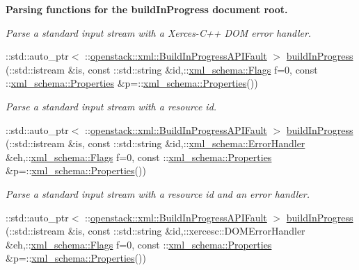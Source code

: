 \begin{Indent}{\bf Parsing functions for the buildInProgress document root.}
\begin{DoxyCompactItemize}
\begin{DoxyCompactList}\small\item\em Parse a standard input stream with a Xerces-\/C++ DOM error handler. \item\end{DoxyCompactList}\item 
::std::auto\_\-ptr$<$ ::\hyperlink{classopenstack_1_1xml_1_1BuildInProgressAPIFault}{openstack::xml::BuildInProgressAPIFault} $>$ \hyperlink{namespaceopenstack_1_1xml_a469ba28c425132f2e3344b29dd119644}{buildInProgress} (::std::istream \&is, const ::std::string \&id,::\hyperlink{namespacexml__schema_affb4c227cbd9aa7453dd1dc5a1401943}{xml\_\-schema::Flags} f=0, const ::\hyperlink{namespacexml__schema_ad27ce19a7ee1d3b1064092648898f64c}{xml\_\-schema::Properties} \&p=::\hyperlink{namespacexml__schema_ad27ce19a7ee1d3b1064092648898f64c}{xml\_\-schema::Properties}())
\begin{DoxyCompactList}\small\item\em Parse a standard input stream with a resource id. \item\end{DoxyCompactList}\item 
::std::auto\_\-ptr$<$ ::\hyperlink{classopenstack_1_1xml_1_1BuildInProgressAPIFault}{openstack::xml::BuildInProgressAPIFault} $>$ \hyperlink{namespaceopenstack_1_1xml_a623472f895d7b30ed4aacee797fd05dc}{buildInProgress} (::std::istream \&is, const ::std::string \&id,::\hyperlink{namespacexml__schema_ab1c9361bfd3b404eaabf0c31eded79dc}{xml\_\-schema::ErrorHandler} \&eh,::\hyperlink{namespacexml__schema_affb4c227cbd9aa7453dd1dc5a1401943}{xml\_\-schema::Flags} f=0, const ::\hyperlink{namespacexml__schema_ad27ce19a7ee1d3b1064092648898f64c}{xml\_\-schema::Properties} \&p=::\hyperlink{namespacexml__schema_ad27ce19a7ee1d3b1064092648898f64c}{xml\_\-schema::Properties}())
\begin{DoxyCompactList}\small\item\em Parse a standard input stream with a resource id and an error handler. \item\end{DoxyCompactList}\item 
::std::auto\_\-ptr$<$ ::\hyperlink{classopenstack_1_1xml_1_1BuildInProgressAPIFault}{openstack::xml::BuildInProgressAPIFault} $>$ \hyperlink{namespaceopenstack_1_1xml_a7153ca9bfacda00c35464c93e423c4ff}{buildInProgress} (::std::istream \&is, const ::std::string \&id,::xercesc::DOMErrorHandler \&eh,::\hyperlink{namespacexml__schema_affb4c227cbd9aa7453dd1dc5a1401943}{xml\_\-schema::Flags} f=0, const ::\hyperlink{namespacexml__schema_ad27ce19a7ee1d3b1064092648898f64c}{xml\_\-schema::Properties} \&p=::\hyperlink{namespacexml__schema_ad27ce19a7ee1d3b1064092648898f64c}{xml\_\-schema::Properties}())

\end{DoxyCompactItemize}
\end{Indent}
